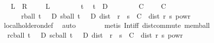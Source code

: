 \begin{isabellebody}
\ \ {\isacharparenleft}{\kern0pt}\ {\isachardoublequoteopen}{\isacharquery}{\kern0pt}L\ {\isasymlongleftrightarrow}\ {\isacharquery}{\kern0pt}R{\isachardoublequoteclose}{\isacharparenright}{\kern0pt}\isanewline
%
\isadelimproof
%
\endisadelimproof
%
\isatagproof
{}\isamarkupfalse%
\isanewline
\ \ \isamarkupfalse%
\ {\isacharasterisk}{\kern0pt}{\isacharcolon}{\kern0pt}\ {\isacharquery}{\kern0pt}L\isanewline
\ \ \isacommand{{\isacharbraceleft}{\kern0pt}}\isamarkupfalse%
\isanewline
\ \ \ \ \isamarkupfalse%
\ t\ \isamarkupfalse%
\ {\isachardoublequoteopen}t\ {\isasymin}\ D{\isachardoublequoteclose}\isanewline
\ \ \ \ \isamarkupfalse%
\ \isamarkupfalse%
\ {\isasymepsilon}\ C\ \ {\isachardoublequoteopen}{\isasymepsilon}\ {\isachargreater}{\kern0pt}\ {}{\isachardoublequoteclose}\ {\isachardoublequoteopen}C\ {\isasymge}\ {}{\isachardoublequoteclose}\isanewline
\ \ \ \ \ \ {\isachardoublequoteopen}{\isasymforall}r{\isasymin}ball\ t\ {\isasymepsilon}\ {\isasyminter}\ D{\isachardot}{\kern0pt}\ {\isasymforall}s{\isasymin}ball\ t\ {\isasymepsilon}\ {\isasyminter}\ D{\isachardot}{\kern0pt}\ dist\ {\isacharparenleft}{\kern0pt}{\isasymphi}\ r{\isacharparenright}{\kern0pt}\ {\isacharparenleft}{\kern0pt}{\isasymphi}\ s{\isacharparenright}{\kern0pt}\ {\isasymle}\ C\ {\isacharasterisk}{\kern0pt}\ dist\ r\ s\ powr\ {\isasymgamma}{\isachardoublequoteclose}\isanewline
\ \ \ \ \ \ \isamarkupfalse%
\ {\isacharasterisk}{\kern0pt}\ \isamarkupfalse%
\ local{\isacharunderscore}{\kern0pt}holder{\isacharunderscore}{\kern0pt}on{\isacharunderscore}{\kern0pt}def\ \isamarkupfalse%
\ auto\isanewline
\ \ \ \ \ \ \isamarkupfalse%
\ {\isacharparenleft}{\kern0pt}metis\ Int{\isacharunderscore}{\kern0pt}iff\ dist{\isacharunderscore}{\kern0pt}commute\ mem{\isacharunderscore}{\kern0pt}ball{\isacharparenright}{\kern0pt}\isanewline
\ \ \ \ \isamarkupfalse%
\ \isamarkupfalse%
\ {\isacharasterisk}{\kern0pt}{\isacharasterisk}{\kern0pt}{\isacharcolon}{\kern0pt}\ {\isachardoublequoteopen}{\isasymforall}r{\isasymin}cball\ t\ {\isacharparenleft}{\kern0pt}{\isasymepsilon}{\isacharslash}{\kern0pt}{}{\isacharparenright}{\kern0pt}\ {\isasyminter}\ D{\isachardot}{\kern0pt}\ {\isasymforall}s{\isasymin}cball\ t\ {\isacharparenleft}{\kern0pt}{\isasymepsilon}{\isacharslash}{\kern0pt}{}{\isacharparenright}{\kern0pt}\ {\isasyminter}\ D{\isachardot}{\kern0pt}\ dist\ {\isacharparenleft}{\kern0pt}{\isasymphi}\ r{\isacharparenright}{\kern0pt}\ {\isacharparenleft}{\kern0pt}{\isasymphi}\ s{\isacharparenright}{\kern0pt}\ {\isasymle}\ C\ {\isacharasterisk}{\kern0pt}\ dist\ r\ s\ powr\ {\isasymgamma}{\isachardoublequoteclose}\isanewline

\end{isabellebody}

